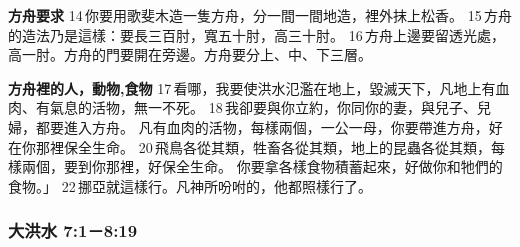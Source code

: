 \textbf{方舟要求} 
14 你要用歌斐木造一隻方舟，分一間一間地造，裡外抹上松香。 15 方舟的造法乃是這樣：要長三百肘，寬五十肘，高三十肘。 16 方舟上邊要留透光處，高一肘。方舟的門要開在旁邊。方舟要分上、中、下三層。 

\textbf{方舟裡的人，動物,食物}
17 看哪，我要使洪水氾濫在地上，毀滅天下，凡地上有血肉、有氣息的活物，無一不死。 18 我卻要與你立約，你同你的妻，與兒子、兒婦，都要進入方舟。 
凡有血肉的活物，每樣兩個，一公一母，你要帶進方舟，好在你那裡保全生命。 20 飛鳥各從其類，牲畜各從其類，地上的昆蟲各從其類，每樣兩個，要到你那裡，好保全生命。
你要拿各樣食物積蓄起來，好做你和牠們的食物。」 22 挪亞就這樣行。凡神所吩咐的，他都照樣行了。



\subsubsection{大洪水 7:1－8:19}
